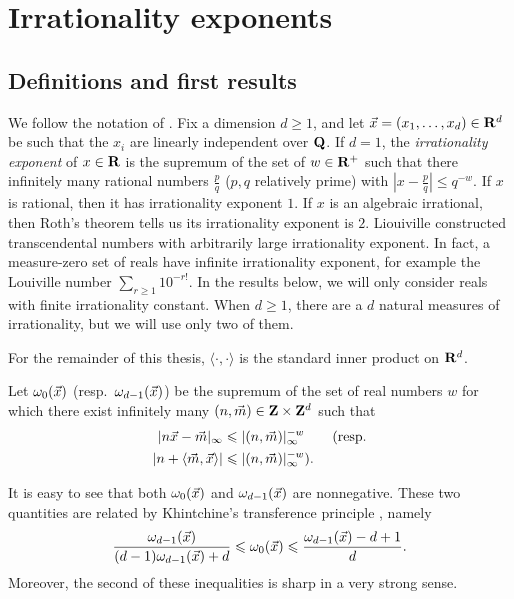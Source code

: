 
\chapter{Irrationality exponents}\label{chapter:irrationality-exponent}





\section{Definitions and first results}

We follow the notation of \cite{laurent-2009}. Fix a dimension 
$d\geqslant 1$, and let $\vec{x}=(x_1,\dots,x_d)\in \mathbf{R}^d$ be such that the $x_i$ 
are linearly independent over $\mathbf{Q}$. If $d = 1$, the \emph{irrationality 
exponent} of $x\in \mathbf{R}$ is the supremum of the set of $w\in \mathbf{R}^+$ such that 
there infinitely many rational numbers $\frac p q$ ($p,q$ relatively prime) with 
$\left| x - \frac p q\right| \leqslant q^{-w}$. If $x$ is rational, then it has 
irrationality exponent $1$. If $x$ is an algebraic irrational, then Roth's 
theorem tells us its irrationality exponent is $2$. Liouiville constructed 
transcendental numbers with arbitrarily large irrationality exponent. In fact, 
a measure-zero set of reals have infinite irrationality exponent, for example 
the Louiville number $\sum_{r\geqslant 1} 10^{-r!}$. In the results below, we 
will only consider reals with finite irrationality constant. When 
$d\geqslant 1$, there are a $d$ natural measures of irrationality, but we will 
use only two of them. 

For the remainder of this thesis, $\langle \cdot,\cdot\rangle$ is the standard 
inner product on $\mathbf{R}^d$. 

\begin{definition}\label{def:approx-exp}
Let $\omega_0(\vec{x})$ (resp.~$\omega_{d-1}(\vec{x})$) be the supremum of the set of 
real numbers $w$ for which there exist infinitely many 
$(n,\vec{m})\in \mathbf{Z}\times\mathbf{Z}^d$ such that 
\begin{align*}
	|n \vec{x} - \vec{m}|_\infty 
		&\leqslant |(n,\vec{m})|_\infty^{-w}  \qquad\text{(resp.} \\
	|n +\langle \vec{m},\vec{x}\rangle| 
		&\leqslant |(n,\vec{m})|_\infty^{-w} \text{).}
\end{align*}
\end{definition}

It is easy to see that both $\omega_0(\vec{x})$ and $\omega_{d-1}(\vec{x})$ are 
nonnegative. These two quantities are related by Khintchine's transference 
principle \cite[Th.~2]{laurent-2009}, namely 
\[
	\frac{\omega_{d-1}(\vec{x})}{(d-1) \omega_{d-1}(\vec{x})+d} \leqslant \omega_0(\vec{x}) \leqslant \frac{\omega_{d-1}(\vec{x})-d+1}{d} .
\]
Moreover, the second of these inequalities is sharp in a very strong sense. 

